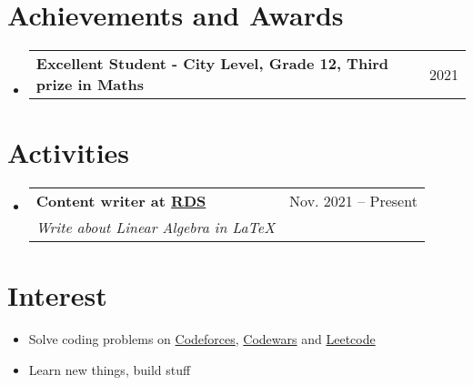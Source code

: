 \documentclass[letterpaper,11pt]{article}
\makeatletter
\newcommand{\resumeItem}[1]{
  \item\small{
    {#1 \vspace{-4pt}}
  }
}
\newcommand{\resumeSubheadTwo}[2]{
  \vspace{-1pt}\item
    \begin{tabular*}{0.97\textwidth}[t]{l@{\extracolsep{\fill}}r}
      \textbf{#1} & #2
    \end{tabular*}\vspace{-5pt}
}
\newcommand{\resumeSubheadThree}[3]{
  \vspace{-1pt}\item
    \begin{tabular*}{0.97\textwidth}[t]{l@{\extracolsep{\fill}}r}
      \textbf{#1} & #2 \\
      \textit{\normalsize#3}
    \end{tabular*}\vspace{-5pt}
}
\newcommand{\resumeSubHeadingListStart}{\begin{itemize}[leftmargin=*]}
\newcommand{\resumeSubHeadingListEnd}{\end{itemize}}
\makeatother
\begin{document}
\section{Achievements and Awards}
    \resumeSubHeadingListStart
        \resumeSubheadTwo{Excellent Student - City Level, Grade 12, Third prize in Maths}{2021}
    \resumeSubHeadingListEnd


\section{Activities}
    \resumeSubHeadingListStart
        \resumeSubheadThree{Content writer at \href{https://www.facebook.com/RDSproject/}{RDS}}{Nov. 2021 -- Present}{Write about Linear Algebra in LaTeX}
    \resumeSubHeadingListEnd
    
    
 \section{Interest}
    \resumeSubHeadingListStart
        \resumeItem{Solve coding problems on \href{https://codeforces.com/profile/sanshironagato}{Codeforces}, \href{https://www.codewars.com/users/ngntrgduc}{Codewars} and \href{https://leetcode.com/ngntrgduc/}{Leetcode}}
        \resumeItem{Learn new things, build stuff}
    \resumeSubHeadingListEnd
    
    
\end{document}
